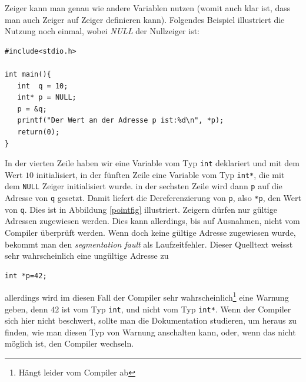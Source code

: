 Zeiger kann man genau wie andere Variablen nutzen (womit auch klar ist, dass man auch Zeiger auf Zeiger definieren kann).
Folgendes Beispiel illustriert die Nutzung noch einmal, wobei \emph{NULL} der Nullzeiger ist:
\begin{lstlisting}
#include<stdio.h>

int main(){
   int  q = 10;
   int* p = NULL;
   p = &q;
   printf("Der Wert an der Adresse p ist:%d\n", *p);
   return(0);
}
\end{lstlisting}
In der vierten Zeile haben wir eine Variable vom Typ \verb|int| deklariert und mit dem Wert $10$ initialisiert, in der fünften Zeile eine Variable vom Typ \verb|int*|, die mit dem \verb|NULL| Zeiger initialisiert wurde.
in der sechsten Zeile wird dann \verb|p| auf die Adresse von \verb|q| gesetzt. 
Damit liefert die Dereferenzierung von \verb|p|, also \verb|*p|, den Wert von \verb|q|.
Dies ist in Abbildung \ref{pointfig} illustriert.
Zeigern dürfen nur gültige Adressen zugewiesen werden.
Dies kann allerdings, bis auf Ausnahmen, nicht vom Compiler überprüft werden.
Wenn doch keine gültige Adresse zugewiesen wurde, bekommt man den \emph{segmentation fault} als Laufzeitfehler.
Dieser Quelltext weisst sehr wahrscheinlich eine ungültige Adresse zu
\begin{lstlisting}
int *p=42;
\end{lstlisting}
allerdings wird im diesen Fall der Compiler sehr wahrscheinlich\footnote{Hängt leider vom Compiler ab} eine Warnung geben, denn $42$ ist vom Typ \verb|int|, und nicht vom Typ \verb|int*|. 
Wenn der Compiler sich hier nicht beschwert, sollte man die Dokumentation studieren, um heraus zu finden, wie man diesen Typ von Warnung anschalten kann, oder, wenn das nicht möglich ist, den Compiler wechseln.



